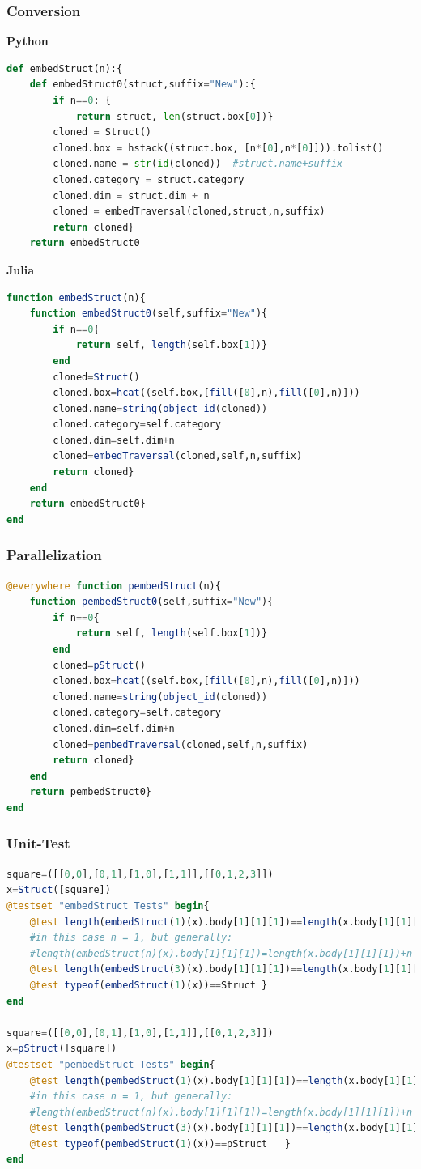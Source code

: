 \documentclass[a4paper,12pt]{article}
\begin{document}
\subsubsection{Conversion}
\textbf{Python}
\begin{lstlisting}[language=Python,format=Julia]
def embedStruct(n):{
    def embedStruct0(struct,suffix="New"):{
        if n==0: {
            return struct, len(struct.box[0])}
        cloned = Struct()
        cloned.box = hstack((struct.box, [n*[0],n*[0]])).tolist()
        cloned.name = str(id(cloned))  #struct.name+suffix
        cloned.category = struct.category
        cloned.dim = struct.dim + n
        cloned = embedTraversal(cloned,struct,n,suffix) 
        return cloned}
    return embedStruct0
\end{lstlisting}
\textbf{Julia}
\begin{lstlisting}[language=Julia,format=Julia]
function embedStruct(n){
	function embedStruct0(self,suffix="New"){
		if n==0{
			return self, length(self.box[1])}
		end
		cloned=Struct()
		cloned.box=hcat((self.box,[fill([0],n),fill([0],n)]))	
		cloned.name=string(object_id(cloned))
		cloned.category=self.category
		cloned.dim=self.dim+n
		cloned=embedTraversal(cloned,self,n,suffix)
		return cloned}
	end
	return embedStruct0}
end
\end{lstlisting}
\subsubsection{Parallelization}
\begin{lstlisting}[language=Julia,format=Julia]
@everywhere function pembedStruct(n){
	function pembedStruct0(self,suffix="New"){
		if n==0{
			return self, length(self.box[1])}
		end
		cloned=pStruct()
		cloned.box=hcat((self.box,[fill([0],n),fill([0],n)]))	
		cloned.name=string(object_id(cloned))
		cloned.category=self.category
		cloned.dim=self.dim+n
		cloned=pembedTraversal(cloned,self,n,suffix)
		return cloned}
	end
	return pembedStruct0}
end
\end{lstlisting}
\subsubsection{Unit-Test}\begin{lstlisting}[language=Julia,format=Julia]
square=([[0,0],[0,1],[1,0],[1,1]],[[0,1,2,3]])
x=Struct([square])	
@testset "embedStruct Tests" begin{
	@test length(embedStruct(1)(x).body[1][1][1])==length(x.body[1][1][1])+1 
	#in this case n = 1, but generally: 
	#length(embedStruct(n)(x).body[1][1][1])=length(x.body[1][1][1])+n
	@test length(embedStruct(3)(x).body[1][1][1])==length(x.body[1][1][1])+3
	@test typeof(embedStruct(1)(x))==Struct	}	
end

square=([[0,0],[0,1],[1,0],[1,1]],[[0,1,2,3]])
x=pStruct([square])	
@testset "pembedStruct Tests" begin{	
	@test length(pembedStruct(1)(x).body[1][1][1])==length(x.body[1][1][1])+1 
	#in this case n = 1, but generally: 
	#length(embedStruct(n)(x).body[1][1][1])=length(x.body[1][1][1])+n
	@test length(pembedStruct(3)(x).body[1][1][1])==length(x.body[1][1][1])+3
	@test typeof(pembedStruct(1)(x))==pStruct	}	
end
\end{lstlisting}
\end{document}
